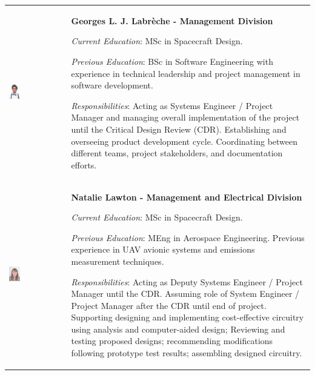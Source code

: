 

\begin{longtable}[]{m{} m{}}

 \includegraphics[width=0.2\textwidth]{1-introduction/img/georges-louis-joseph-labreche.jpg}  & \textbf{Georges L. J. Labrèche - Management Division}

\smallskip
\textit{Current Education}: MSc in Spacecraft Design.

\smallskip
\textit{Previous Education}: BSc in Software Engineering with experience in technical leadership and project management in software development.

\smallskip
\textit{Responsibilities}: Acting as Systems Engineer / Project Manager and managing overall implementation of the project until the Critical Design Review (CDR). Establishing and overseeing product development cycle. Coordinating between different teams, project stakeholders, and documentation efforts.                          
\bigskip
\\

\includegraphics[width=0.2\textwidth]{1-introduction/img/natalie-lawton.jpg} & \textbf{Natalie Lawton - Management and Electrical Division}

\smallskip
\textit{Current Education}: MSc in Spacecraft Design.

\smallskip
\textit{Previous Education}: MEng in Aerospace Engineering. Previous experience in UAV avionic systems and emissions measurement techniques.

\smallskip
\textit{Responsibilities}: Acting as Deputy Systems Engineer / Project Manager until the CDR. Assuming role of System Engineer / Project Manager after the CDR until end of project. Supporting designing and implementing cost-effective circuitry using analysis and computer-aided design; Reviewing and testing proposed designs; recommending modifications following prototype test results; assembling designed circuitry. 
\bigskip
\\


\end{longtable}
